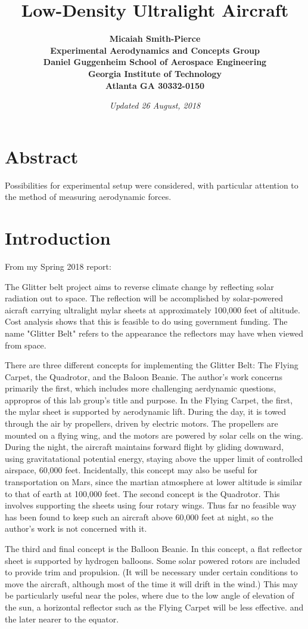 \documentclass[12pt]{report} %
\title{\bf Low-Density Ultralight Aircraft\\  }
\author{\bf Micaiah Smith-Pierce
\\ Experimental Aerodynamics and Concepts Group
\\Daniel Guggenheim School of Aerospace Engineering
\\Georgia Institute of Technology
\\Atlanta GA 30332-0150
}
\date{\it Updated 26 August, 2018} %
\begin{document}
\maketitle
 
\tableofcontents
 
\chapter{Abstract}
Possibilities for experimental setup were considered, with particular attention
to the method of measuring aerodynamic forces.

\chapter{Introduction}

From my Spring 2018 report:
\begin{displayquote}
The Glitter belt project aims to reverse climate change by reflecting solar radiation out to space.  The reflection will be accomplished
by solar-powered aicraft carrying ultralight mylar sheets at approximately 100,000 feet of altitude.  Cost analysis shows that this is
feasible to do using government funding.  The name "Glitter Belt" refers to the appearance the reflectors may have when viewed from space.

There are three different concepts for implementing the Glitter Belt: The Flying Carpet, the Quadrotor, and the Baloon Beanie.  The
author's work concerns primarily the first, which includes more challenging aerdynamic questions,
appropros of this lab group's title and purpose.  In the Flying Carpet,
the first, the mylar sheet is supported by aerodynamic lift.  During the day, it is towed through the air by propellers, driven
by electric motors.  The propellers are mounted on a flying wing, and the motors are powered by solar cells on the wing.  During the
night, the aircraft maintains forward flight by gliding downward, using gravitatational potential energy, staying above the upper limit
of controlled airspace, 60,000 feet.  Incidentally, this concept may also be useful for transportation on Mars, since the martian atmosphere
at lower altitude is similar to that of earth at 100,000 feet.
The second concept is the Quadrotor.  This involves supporting the sheets using four rotary wings.  Thus far no feasible way has been
found to keep such an aircraft above 60,000 feet at night, so the author's work is not concerned with it.

The third and final concept is the Balloon Beanie.  In this concept, a flat reflector sheet is supported by hydrogen balloons.  Some
solar powered rotors are included to provide trim and propulsion. (It will be necessary under certain conditions to move the aircraft,
although most of the time it will drift in the wind.)  This may be particularly useful near the poles, where due to the low angle of
elevation of the sun, a horizontal reflector such as the Flying Carpet will be less effective.
and the later nearer to the equator.
\end{displayquote}
\end{document}
